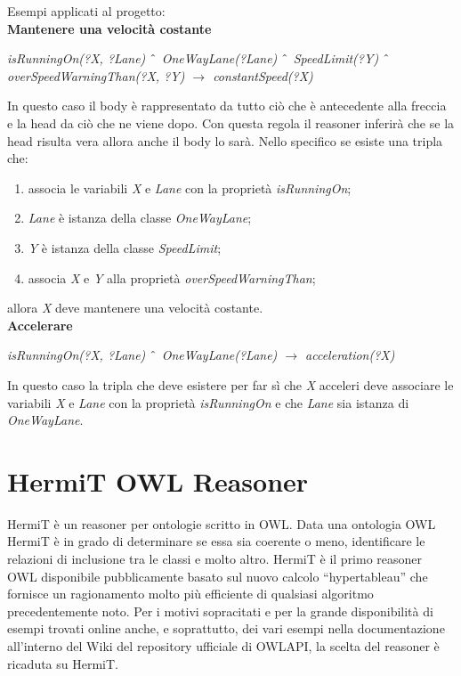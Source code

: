 Esempi applicati al progetto:\\
\textbf{Mantenere una velocit\`a costante}\\
\begin{center}
\emph{isRunningOn(?X, ?Lane) $\char`\^$ OneWayLane(?Lane) $\char`\^$ SpeedLimit(?Y) $\char`\^$ overSpeedWarningThan(?X, ?Y) $\rightarrow$ constantSpeed(?X)}\\
\end{center}
In questo caso il body \`e rappresentato da tutto ci\`o che \`e antecedente alla freccia e la head da ci\`o che ne viene dopo.
Con questa regola il reasoner inferir\`a che se la head risulta vera allora anche il body lo sar\`a.
Nello specifico se esiste una tripla che:
\begin{enumerate}
\item associa le variabili \textit{X} e \textit{Lane} con la propriet\`a \textit{isRunningOn};
\item \textit{Lane} \`e istanza della classe \textit{OneWayLane};
\item \textit{Y} \`e istanza della classe \textit{SpeedLimit};
\item associa \textit{X} e \textit{Y} alla propriet\`a \textit{overSpeedWarningThan};
\end{enumerate}
allora \textit{X} deve mantenere una velocit\`a costante.\\
\textbf{Accelerare}\\
\begin{center}
\emph{isRunningOn(?X, ?Lane) $\char`\^$ OneWayLane(?Lane) $\rightarrow$ acceleration(?X)}\\
\end{center}
In questo caso la tripla che deve esistere per far s\`i che \textit{X} acceleri deve associare le variabili \textit{X} e \textit{Lane} con la propriet\`a \textit{isRunningOn} e che \textit{Lane} sia istanza di \textit{OneWayLane}.

\section{HermiT OWL Reasoner}
HermiT \`e un reasoner per ontologie scritto in OWL.
Data una ontologia OWL HermiT \`e in grado di determinare se essa sia coerente o meno, identificare le relazioni di inclusione tra le classi e molto altro.
HermiT \`e il primo reasoner OWL disponibile pubblicamente basato sul nuovo calcolo ``hypertableau'' che fornisce un ragionamento molto pi\`u efficiente di qualsiasi algoritmo precedentemente noto. \cite{hermit}
Per i motivi sopracitati e per la grande disponibilit\`a di esempi trovati online anche, e soprattutto, dei vari esempi nella documentazione all'interno del Wiki del repository ufficiale di OWLAPI, la scelta del reasoner \`e ricaduta su HermiT.